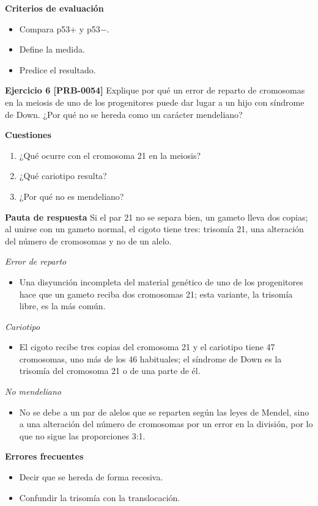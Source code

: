 \documentclass{book}
\begin{document}
\noindent\textbf{Criterios de evaluación}
\begin{itemize}
\item Compara p53+ y p53\(-\).
\item Define la medida.
\item Predice el resultado.
\end{itemize}

\noindent\textbf{Ejercicio 6 [PRB-0054]}
Explique por qué un error de reparto de cromosomas en la meiosis de uno de los progenitores puede dar lugar a un hijo con síndrome de Down. ¿Por qué no se hereda como un carácter mendeliano?


\noindent\textbf{Cuestiones}
\begin{enumerate}
\item ¿Qué ocurre con el cromosoma 21 en la meiosis?
\item ¿Qué cariotipo resulta?
\item ¿Por qué no es mendeliano?
\end{enumerate}

\noindent\textbf{Pauta de respuesta}
Si el par 21 no se separa bien, un gameto lleva dos copias; al unirse con un gameto normal, el cigoto tiene tres: trisomía 21, una alteración del número de cromosomas y no de un alelo.


\noindent\textit{Error de reparto}
\begin{itemize}
\item Una disyunción incompleta del material genético de uno de los progenitores hace que un gameto reciba dos cromosomas 21; esta variante, la trisomía libre, es la más común.
\end{itemize}

\noindent\textit{Cariotipo}
\begin{itemize}
\item El cigoto recibe tres copias del cromosoma 21 y el cariotipo tiene 47 cromosomas, uno más de los 46 habituales; el síndrome de Down es la trisomía del cromosoma 21 o de una parte de él.
\end{itemize}

\noindent\textit{No mendeliano}
\begin{itemize}
\item No se debe a un par de alelos que se reparten según las leyes de Mendel, sino a una alteración del número de cromosomas por un error en la división, por lo que no sigue las proporciones 3:1.
\end{itemize}

\noindent\textbf{Errores frecuentes}
\begin{itemize}
\item Decir que se hereda de forma recesiva.
\item Confundir la trisomía con la translocación.
\end{itemize}
\end{document}
